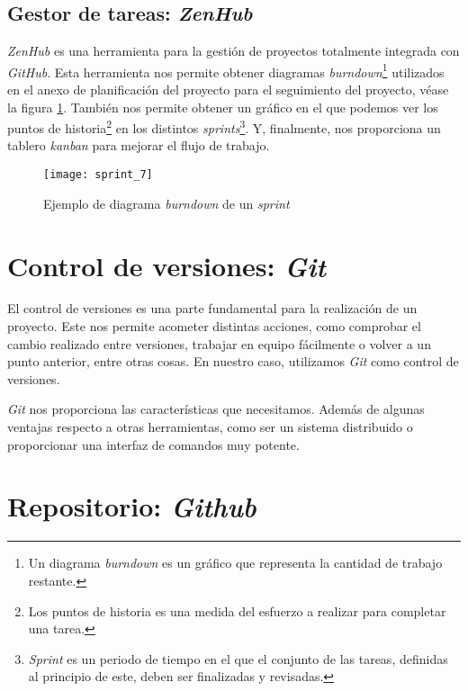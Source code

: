 \subsection{Gestor de tareas: \textit{ZenHub}}

\textit{ZenHub} es una herramienta para la gestión de proyectos totalmente integrada con \textit{GitHub}. Esta herramienta nos permite obtener diagramas \textit{burndown}\footnote{Un diagrama \textit{burndown} es un gráfico que representa la cantidad de trabajo restante.} utilizados en el anexo de planificación del proyecto para el seguimiento del proyecto, véase la figura \ref{fig:4.2.1}. También nos permite obtener un gráfico en el que podemos ver los puntos de historia\footnote{Los puntos de historia es una medida del esfuerzo a realizar para completar una tarea.} en los distintos \textit{sprints}\footnote{\textit{Sprint} es un periodo de tiempo en el que el conjunto de las tareas, definidas al principio de este, deben ser finalizadas y revisadas.}. Y, finalmente, nos proporciona un tablero \textit{kanban} para mejorar el flujo de trabajo.

\begin{figure}[h]
\centering
\texttt{[image: sprint\_7]}
\caption{Ejemplo de diagrama \textit{burndown} de un  \textit{sprint}}
\label{fig:4.2.1}
\end{figure}

\section{Control de versiones: \textit{Git}}

El control de versiones es una parte fundamental para la realización de un proyecto. Este nos permite acometer distintas acciones, como comprobar el cambio realizado entre versiones, trabajar en equipo fácilmente o volver a un punto anterior, entre otras cosas. En nuestro caso, utilizamos \textit{Git} como control de versiones. 

\textit{Git} nos proporciona las características que necesitamos. Además de algunas ventajas respecto a otras herramientas, como ser un sistema distribuido o proporcionar una interfaz de comandos muy potente.


\section{Repositorio: \textit{Github}}

